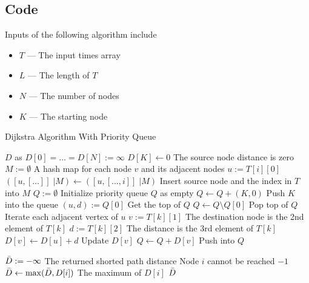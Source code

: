 \subsection{Code}
Inputs of the following algorithm include
\begin{itemize}
\item $T$ --- The input times array
\item $L$ --- The length of $T$
\item $N$ --- The number of nodes
\item $K$ --- The starting node
\end{itemize}
\begin{algorithm}[H]
\caption{Dijkstra Algorithm With Priority Queue}
\begin{algorithmic}[1]
\State $D$ as $D[0]=\ldots=D[N]:=\infty$
\State $D[K]\gets 0$ \Comment The source node distance is zero
\State $M:=\emptyset$ \Comment A hash map for each node $v$ and its adjacent nodes
\State $u:= T[i][0]$
\State $([u, [\ldots]]\;|M) \gets ([u, [\ldots, i]]\;|M)$ \Comment Insert source node and the index in $T$ into $M$
\EndFor
\State $Q:=\emptyset$ \Comment Initialize priority queue $Q$ as empty
\State $Q\gets Q + (K, 0)$ \Comment Push $K$ into the queue
\State $(u, d):= Q[0]$ \Comment Get the top of $Q$
\State $Q\gets Q \setminus Q[0]$ \Comment Pop top of $Q$
 \Comment Iterate each adjacent vertex of $u$
\State $v:= T[k][1]$ \Comment The destination node is the 2nd element of $T[k]$
\State $d:=T[k][2]$ \Comment The distance is the 3rd element of $T[k]$
\State $D[v]\gets D[u] + d$ \Comment Update $D[v]$
\State $Q\gets Q + D[v]$ \Comment Push into $Q$
\EndIf
\EndFor
\EndWhile
{}
\end{algorithmic}
\end{algorithm}

\begin{algorithm}[H]
\begin{algorithmic}[1]
\State $\Bar{D}:= -\infty$ \Comment The returned shorted path distance
 \Comment Node $i$ cannot be reached
\State \Return $-1$
\EndIf
\State $\Bar{D} \gets \max(\Bar{D}, D[i]) $ \Comment The maximum of $D[i]$
\EndFor
\State \Return $\Bar{D}$
\EndProcedure
\end{algorithmic}
\end{algorithm}

